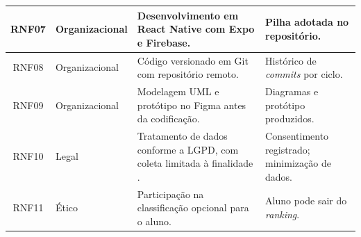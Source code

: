 \begin{quadrolongo}
\begin{longtable}{|c|p{2.3cm}|p{7.0cm}|p{3.6cm}|}
    RNF07 & Organizacional & Desenvolvimento em React Native com Expo e Firebase. & Pilha adotada no repositório. \\ \hline
    RNF08 & Organizacional & Código versionado em Git com repositório remoto. & Histórico de \textit{commits} por ciclo. \\ \hline
    RNF09 & Organizacional & Modelagem UML e protótipo no Figma antes da codificação. & Diagramas e protótipo produzidos. \\ \hline
    RNF10 & Legal & Tratamento de dados conforme a LGPD, com coleta limitada à finalidade \cite{lgpd2018}. & Consentimento registrado; minimização de dados. \\ \hline
    RNF11 & Ético & Participação na classificação opcional para o aluno. & Aluno pode sair do \textit{ranking}. \\ \hline
\end{longtable}
\end{quadrolongo}